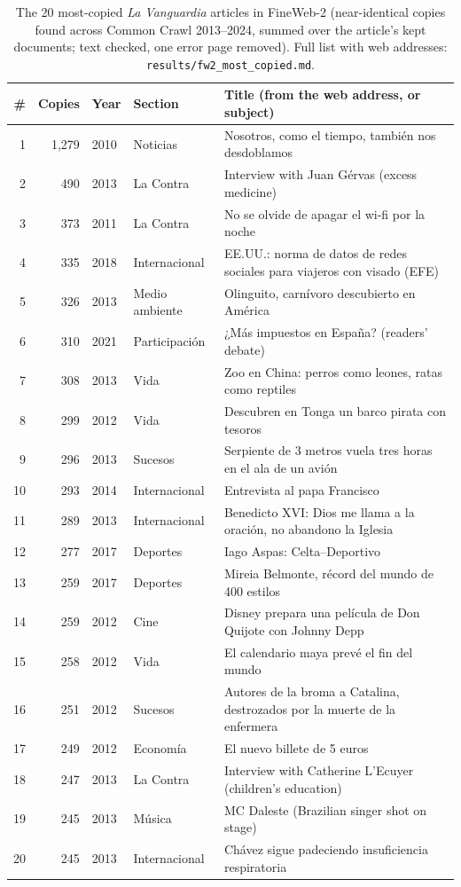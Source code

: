\documentclass[10pt,a4paper]{article}
\begin{document}
\begin{table}[h]\centering\footnotesize
\begin{tabularx}{\linewidth}{rrll>{\raggedright\arraybackslash}X}
\toprule
\# & Copies & Year & Section & Title (from the web address, or subject)\\
\midrule
1 & 1,279 & 2010 & Noticias & Nosotros, como el tiempo, también nos desdoblamos\\
2 & 490 & 2013 & La Contra & Interview with Juan Gérvas (excess medicine)\\
3 & 373 & 2011 & La Contra & No se olvide de apagar el wi-fi por la noche\\
4 & 335 & 2018 & Internacional & EE.UU.: norma de datos de redes sociales para viajeros con visado (EFE)\\
5 & 326 & 2013 & Medio ambiente & Olinguito, carnívoro descubierto en América\\
6 & 310 & 2021 & Participación & ¿Más impuestos en España? (readers' debate)\\
7 & 308 & 2013 & Vida & Zoo en China: perros como leones, ratas como reptiles\\
8 & 299 & 2012 & Vida & Descubren en Tonga un barco pirata con tesoros\\
9 & 296 & 2013 & Sucesos & Serpiente de 3 metros vuela tres horas en el ala de un avión\\
10 & 293 & 2014 & Internacional & Entrevista al papa Francisco\\
11 & 289 & 2013 & Internacional & Benedicto XVI: Dios me llama a la oración, no abandono la Iglesia\\
12 & 277 & 2017 & Deportes & Iago Aspas: Celta--Deportivo\\
13 & 259 & 2017 & Deportes & Mireia Belmonte, récord del mundo de 400 estilos\\
14 & 259 & 2012 & Cine & Disney prepara una película de Don Quijote con Johnny Depp\\
15 & 258 & 2012 & Vida & El calendario maya prevé el fin del mundo\\
16 & 251 & 2012 & Sucesos & Autores de la broma a Catalina, destrozados por la muerte de la enfermera\\
17 & 249 & 2012 & Economía & El nuevo billete de 5 euros\\
18 & 247 & 2013 & La Contra & Interview with Catherine L'Ecuyer (children's education)\\
19 & 245 & 2013 & Música & MC Daleste (Brazilian singer shot on stage)\\
20 & 245 & 2013 & Internacional & Chávez sigue padeciendo insuficiencia respiratoria\\
\bottomrule
\end{tabularx}
\caption{The 20 most-copied \emph{La Vanguardia} articles in FineWeb-2 (near-identical copies found across Common
Crawl 2013--2024, summed over the article's kept documents; text checked, one error page removed).
Full list with web addresses: \texttt{results/fw2\_most\_copied.md}.}\label{tab:mostcopied}
\end{table}
\end{document}
